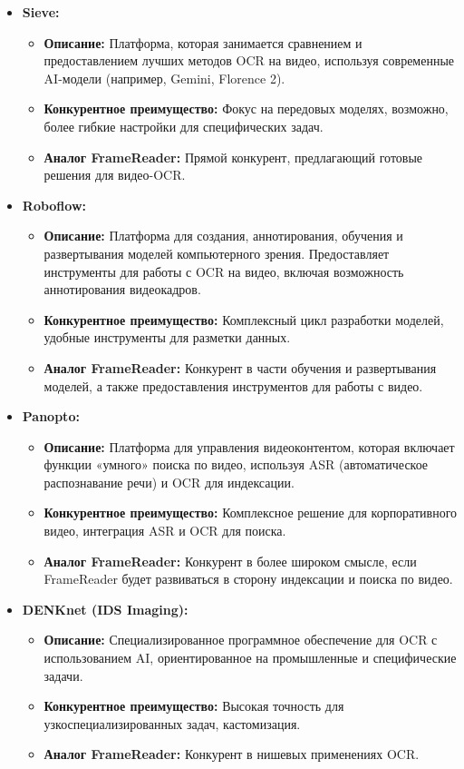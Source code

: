 \documentclass[12pt, a4paper]{article}
\theoremstyle{definition}
\theoremstyle{remark}
\begin{document}
	\begin{itemize}
		\item \textbf{Sieve:}
		\begin{itemize}
			\item \textbf{Описание:} Платформа, которая занимается сравнением и предоставлением лучших методов OCR на видео, используя современные AI-модели (например, Gemini, Florence 2).
			\item \textbf{Конкурентное преимущество:} Фокус на передовых моделях, возможно, более гибкие настройки для специфических задач.
			\item \textbf{Аналог FrameReader:} Прямой конкурент, предлагающий готовые решения для видео-OCR.
		\end{itemize}
		\item \textbf{Roboflow:}
		\begin{itemize}
			\item \textbf{Описание:} Платформа для создания, аннотирования, обучения и развертывания моделей компьютерного зрения. Предоставляет инструменты для работы с OCR на видео, включая возможность аннотирования видеокадров.
			\item \textbf{Конкурентное преимущество:} Комплексный цикл разработки моделей, удобные инструменты для разметки данных.
			\item \textbf{Аналог FrameReader:} Конкурент в части обучения и развертывания моделей, а также предоставления инструментов для работы с видео.
		\end{itemize}
		\item \textbf{Panopto:}
		\begin{itemize}
			\item \textbf{Описание:} Платформа для управления видеоконтентом, которая включает функции «умного» поиска по видео, используя ASR (автоматическое распознавание речи) и OCR для индексации.
			\item \textbf{Конкурентное преимущество:} Комплексное решение для корпоративного видео, интеграция ASR и OCR для поиска.
			\item \textbf{Аналог FrameReader:} Конкурент в более широком смысле, если FrameReader будет развиваться в сторону индексации и поиска по видео.
		\end{itemize}
		\item \textbf{DENKnet (IDS Imaging):}
		\begin{itemize}
			\item \textbf{Описание:} Специализированное программное обеспечение для OCR с использованием AI, ориентированное на промышленные и специфические задачи.
			\item \textbf{Конкурентное преимущество:} Высокая точность для узкоспециализированных задач, кастомизация.
			\item \textbf{Аналог FrameReader:} Конкурент в нишевых применениях OCR.
		\end{itemize}
	\end{itemize}
	
\end{document}
